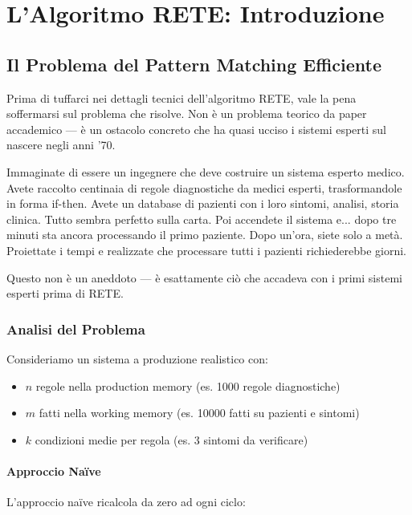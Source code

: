 
\chapter{L'Algoritmo RETE: Introduzione}
\label{cap:rete_intro}

\section{Il Problema del Pattern Matching Efficiente}

Prima di tuffarci nei dettagli tecnici dell'algoritmo RETE, vale la pena soffermarsi sul problema che risolve. Non è un problema teorico da paper accademico — è un ostacolo concreto che ha quasi ucciso i sistemi esperti sul nascere negli anni '70.

Immaginate di essere un ingegnere che deve costruire un sistema esperto medico. Avete raccolto centinaia di regole diagnostiche da medici esperti, trasformandole in forma if-then. Avete un database di pazienti con i loro sintomi, analisi, storia clinica. Tutto sembra perfetto sulla carta. Poi accendete il sistema e... dopo tre minuti sta ancora processando il primo paziente. Dopo un'ora, siete solo a metà. Proiettate i tempi e realizzate che processare tutti i pazienti richiederebbe giorni.

Questo non è un aneddoto — è esattamente ciò che accadeva con i primi sistemi esperti prima di RETE.

\subsection{Analisi del Problema}

Consideriamo un sistema a produzione realistico con:
\begin{itemize}
\item $n$ regole nella production memory (es. 1000 regole diagnostiche)
\item $m$ fatti nella working memory (es. 10000 fatti su pazienti e sintomi)
\item $k$ condizioni medie per regola (es. 3 sintomi da verificare)
\end{itemize}

\subsubsection{Approccio Naïve}

L'approccio naïve ricalcola da zero ad ogni ciclo:

